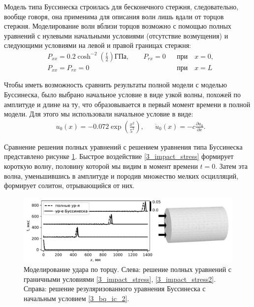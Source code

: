 \documentclass[12pt, a4paper]{report}
\newcommand{\lb}{\left (}
\newcommand{\rb}{\right )}
\newcommand{\pdiff}[2]{\frac{\partial #1}{\partial #2}}
\begin{document}
Модель типа Буссинеска строилась для бесконечного стержня, следовательно, вообще говоря, она применима для описания волн лишь вдали от торцов стержня. Моделирование волн вблизи торцов возможно с помощью полных уравнений с нулевыми начальными условиями (отсутствие возмущения) и следующими условиями на левой и правой границах стержня:
\begin{align}
\label{3_impact_stress}
&P_{xx} = 0.2 \cosh^{-2}\lb\frac t 2\rb\mbox{ГПа}, \qquad P_{rx} = 0&  &\mbox{при}\quad x = 0,\\
\label{3_impact_stress2}
&P_{xx} = P_{rx} = 0&  &\mbox{при}\quad x = L
\end{align}

Чтобы иметь возможность сравнить результаты полной модели с моделью Буссинеска, было выбрано начальное условие в виде узкой волны, похожей по амплитуде и длине на ту, что образовывается в первый момент времени в полной модели. Для этого мы использовали начальное условие в виде:
\begin{align}
\label{3_bq_ic_2}
& u_0 (x) = -0.072 \exp\lb \frac{x^2}{5^2}\rb,&  &\dot{u}_0 (x) = -c \pdiff{u_0}{x}.
\end{align}

Сравнение решения полных уравнений с решением уравнения типа Буссинеска представлено рисунке \ref{fig:impact}. Быстрое воздействие \eqref{3_impact_stress} формирует короткую волну, половину которой мы видим в момент времени $t=0$. Затем эта волна, уменьшившись в амплитуде и породив множество мелких осцилляций, формирует солитон, отрывающийся от них.
\begin{figure}[h]
	\centering
	\includegraphics[width=\linewidth]{figures/Impact_mod}
	\caption{Моделирование удара по торцу. Слева: решение полных уравнений с граничными условиями \eqref{3_impact_stress}, \eqref{3_impact_stress2}. Справа: решение резуляризованного уравнения Буссинеска с начальным условием \eqref{3_bq_ic_2}.}
	\label{fig:impact}
\end{figure}
\end{document}
